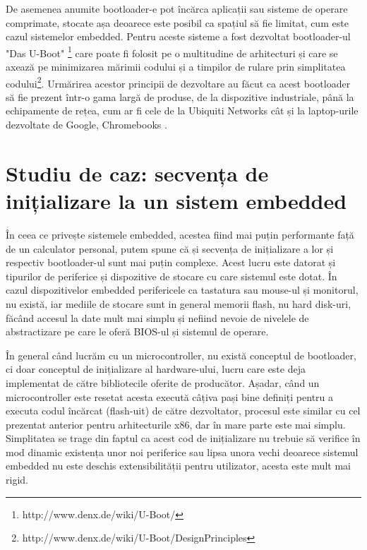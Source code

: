 \documentclass[12pt,a4paper,titlepage]{report}
\begin{document}
De asemenea anumite bootloader-e pot încărca aplicații sau sisteme de operare comprimate, stocate așa deoarece este posibil ca spațiul să fie limitat, cum este cazul sistemelor embedded. Pentru aceste sisteme a fost dezvoltat bootloader-ul "Das U-Boot" \footnote{http://www.denx.de/wiki/U-Boot/} care poate fi folosit pe o multitudine de arhitecturi și care se axează pe minimizarea mărimii codului și a timpilor de rulare prin simplitatea codului\footnote{http://www.denx.de/wiki/U-Boot/DesignPrinciples}. Urmărirea acestor principii de dezvoltare au făcut ca acest bootloader să fie prezent într-o gama largă  de produse, de la dispozitive industriale, până la echipamente de rețea, cum ar fi cele de la Ubiquiti Networks cât și la laptop-urile dezvoltate de Google, Chromebooks \cite{wikiUboot}.

\section{Studiu de caz: secvența de inițializare la un sistem embedded}

În ceea ce privește sistemele embedded, acestea fiind mai puțin performante față de un calculator personal, putem spune că și secvența de inițializare a lor și respectiv bootloader-ul sunt mai puțin complexe.
Acest lucru este datorat și tipurilor de periferice și dispozitive de stocare cu care sistemul este dotat. În cazul dispozitivelor embedded perifericele ca tastatura sau mouse-ul și monitorul, nu există, iar mediile de stocare sunt in general memorii flash, nu hard disk-uri, făcând accesul la date mult mai simplu și nefiind nevoie de nivelele de abstractizare pe care le oferă BIOS-ul și sistemul de operare.

În general când lucrăm cu un microcontroller, nu există conceptul de bootloader, ci doar conceptul de inițializare al hardware-ului, lucru care este deja implementat de către bibliotecile oferite de producător.
Așadar, când un microcontroller este resetat acesta execută câțiva pași bine definiți pentru a executa codul încărcat (flash-uit) de către dezvoltator, procesul este similar cu cel prezentat anterior pentru arhitecturile x86, dar în mare parte este mai simplu. Simplitatea se trage din faptul ca acest cod de inițializare nu trebuie să verifice în mod dinamic existența unor noi periferice sau lipsa unora vechi deoarece sistemul embedded nu este deschis extensibilității pentru utilizator, acesta este mult mai rigid.
\end{document}
